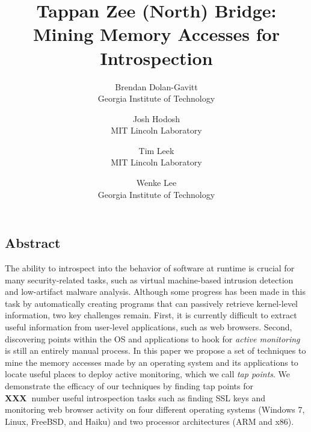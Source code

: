 \documentclass[letterpaper,twocolumn,10pt,draft]{article}
\newcommand{\fixme}{{\bf XXX\ }}
\begin{document}
\date{}

\title{\Large \bf Tappan Zee (North) Bridge: Mining Memory Accesses for Introspection}

\author{
{\rm Brendan Dolan-Gavitt}\\
Georgia Institute of Technology
\and
{\rm Josh Hodosh}\\
MIT Lincoln Laboratory
\and
{\rm Tim Leek}\\
MIT Lincoln Laboratory
\and
{\rm Wenke Lee}\\
Georgia Institute of Technology
} %

\maketitle


\subsection*{Abstract}

The ability to introspect into the behavior of software at runtime is
crucial for many security-related tasks, such as virtual machine-based
intrusion detection and low-artifact malware analysis. Although some
progress has been made in this task by automatically creating programs
that can passively retrieve kernel-level information, two key challenges
remain. First, it is currently difficult to extract useful information
from user-level applications, such as web browsers. Second, discovering
points within the OS and applications to hook for \emph{active
monitoring} is still an entirely manual process. In this paper we
propose a set of techniques to mine the memory accesses made by an
operating system and its applications to locate useful places to deploy
active monitoring, which we call \emph{tap points}. We demonstrate the
efficacy of our techniques by finding tap points for \fixme{number}
useful introspection tasks such as finding SSL keys and monitoring web
browser activity on four different operating systems (Windows 7, Linux,
FreeBSD, and Haiku) and two processor architectures (ARM and x86).




\end{document}
